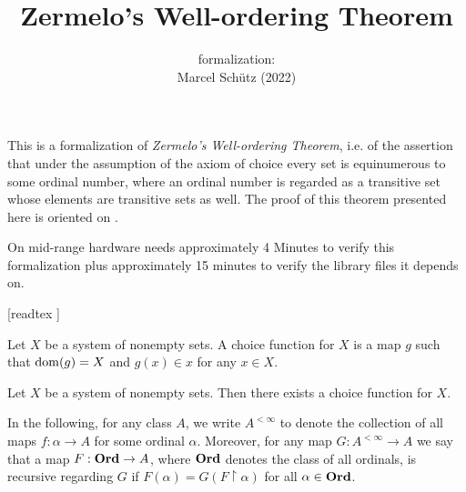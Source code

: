 \documentclass{article}
\title{Zermelo's Well-ordering Theorem}
\author{\Naproche formalization: \vspace{0.5em} \\
Marcel Schütz (2022)}
\date{}
\begin{document}
  \maketitle

  \noindent This is a formalization of \textit{Zermelo's Well-ordering Theorem},
  i.e. of the assertion that under the assumption of the axiom of choice every
  set is equinumerous to some ordinal number, where an ordinal number is
  regarded as a transitive set whose elements are transitive sets as well.
  The proof of this theorem presented here is oriented on \cite{Koepke2018}.

  On mid-range hardware \Naproche needs approximately 4 Minutes to verify this
  formalization plus approximately 15 minutes to verify the library files it
  depends on.

  \begin{forthel}

    [readtex ]
  \end{forthel}

  \begin{forthel}
    \begin{definition*}
      Let $X$ be a system of nonempty sets.
      A choice function for $X$ is a map $g$ such that $\operatorname{dom}(g) = X$ and
      $g(x) \in x$ for any $x \in X$.
    \end{definition*}

    \begin{axiom*}[Choice]
      Let $X$ be a system of nonempty sets.
      Then there exists a choice function for $X$.
    \end{axiom*}
  \end{forthel}

  \noindent In the following, for any class $A$, we write $A^{< \infty}$ to
  denote the collection of all maps $f : \alpha \to A$ for some ordinal
  $\alpha$.
  Moreover, for any map $G : A^{< \infty} \to A$ we say that a map $F : \mathbf{Ord} \to
  A$, where $\mathbf{Ord}$ denotes the class of all ordinals, is recursive regarding $G$
  if $F(\alpha) = G(F \restriction \alpha)$ for all $\alpha \in \mathbf{Ord}$.
\end{document}
